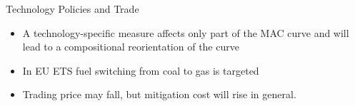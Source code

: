


{Technology Policies and Trade}
\begin{itemize}
\item<1-> A technology-specific measure affects only part of the MAC curve and will lead to a compositional reorientation of the curve
\item<2-> In EU ETS fuel switching from coal to gas is targeted
\item<3-> Trading price may fall, but mitigation cost will rise in general.
\end{itemize}






